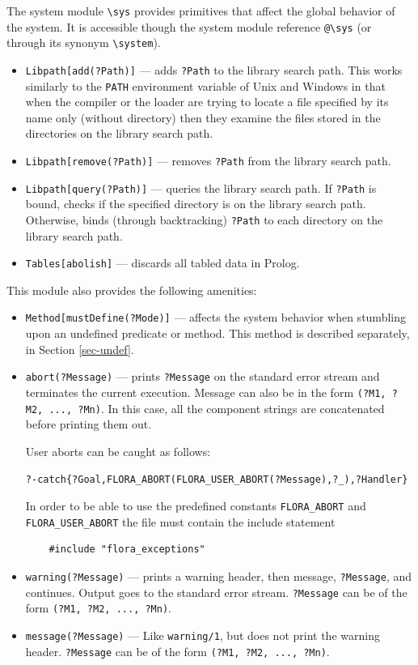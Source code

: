 \documentclass[11pt]{article}
\newcommand{\FLABORT}{FLORA\_ABORT}
\newcommand{\FLUSERABORT}{FLORA\_USER\_ABORT}
\newcommand{\bs}{\textbackslash}
\begin{document}
The system module {\tt \bs{}sys} provides primitives that affect the global
behavior of the system. It is accessible though the system module reference
{\tt @\bs{}sys} (or through its synonym {\tt \bs{}system}). 
\begin{itemize}
  \item  {\tt Libpath[add(?Path)]} --- adds {\tt ?Path} to the library
    search path. This works similarly to the {\tt PATH} environment
    variable of Unix and Windows
    in that when the compiler or the loader are trying to locate a
    file specified by its name only (without directory) then they
    examine the files stored in the directories on the library search path.
  \item {\tt Libpath[remove(?Path)]} --- removes {\tt ?Path} from the
    library search path.
  \item {\tt Libpath[query(?Path)]} --- queries the library search path. If
    {\tt ?Path} is bound, checks if the specified directory is on the
    library search path. Otherwise, binds (through backtracking) {\tt ?Path}
    to each directory on the library search path.
  \item {\tt Tables[abolish]} --- discards all tabled data in Prolog.
\end{itemize}
This module also provides the following amenities:
\begin{itemize}
\item \texttt{Method[mustDefine(?Mode)]} --- affects the system behavior when
  stumbling upon an undefined predicate or method. This method is described
  separately, in Section \ref{sec-undef}.
  \item  {\tt abort(?Message)} --- prints {\tt ?Message} on the standard error
  stream and terminates the current execution. Message can also be in the
  form {\tt (?M1, ?M2, ..., ?Mn)}. In this case, all the component strings are
  concatenated before printing them out.

  User aborts can be caught as follows:
  \begin{alltt}
   ?- catch\{?Goal, \FLABORT(\FLUSERABORT(?Message),?_), ?Handler\}
  \end{alltt}
  In order to be able to use the predefined constants {\tt \FLABORT} and
  {\tt \FLUSERABORT} the file must contain the include statement
  \begin{verbatim}
    #include "flora_exceptions"    
  \end{verbatim}
\item {\tt warning(?Message)} --- prints a warning header, then message,
  {\tt ?Message}, and continues. Output goes to the standard error
  stream. {\tt ?Message} can be of the form {\tt (?M1, ?M2, ..., ?Mn)}.
\item {\tt message(?Message)} --- Like {\tt warning/1}, but does not print
  the warning header. {\tt ?Message} can be of the form {\tt (?M1, ?M2, ..., ?Mn)}.
\end{itemize}
\end{document}
